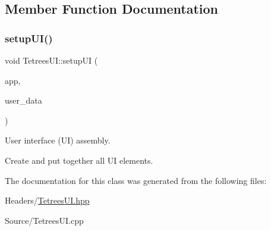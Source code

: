 \subsection{Member Function Documentation}
\mbox{\label{classTetreesUI_a492d68860089cfbe52c5756b2c3cd2ae}} 
\subsubsection{\texorpdfstring{setup\+U\+I()}{setupUI()}}
{\footnotesize\ttfamily void Tetrees\+U\+I\+::setup\+UI (\begin{DoxyParamCaption}\item[{Gtk\+Application $\ast$}]{app,  }\item[{gpointer}]{user\+\_\+data }\end{DoxyParamCaption})}



User interface (UI) assembly. 

Create and put together all UI elements. 

The documentation for this class was generated from the following files\+:\begin{DoxyCompactItemize}
\item 
Headers/\hyperlink{TetreesUI_8hpp}{Tetrees\+U\+I.\+hpp}\item 
Source/Tetrees\+U\+I.\+cpp\end{DoxyCompactItemize}
